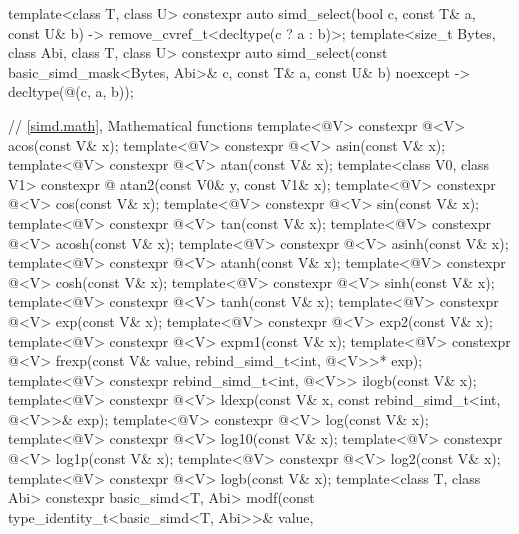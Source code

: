 \begin{codeblock}
{  template<class T, class U>
    constexpr auto simd_select(bool c, const T& a, const U& b)
    -> remove_cvref_t<decltype(c ? a : b)>;
  template<size_t Bytes, class Abi, class T, class U>
    constexpr auto simd_select(const basic_simd_mask<Bytes, Abi>& c, const T& a, const U& b)
    noexcept -> decltype(@\simdselect@(c, a, b));

  // \ref{simd.math}, Mathematical functions
  template<@\mathfloatingpoint@ V> constexpr @\deducedsimd@<V> acos(const V& x);
  template<@\mathfloatingpoint@ V> constexpr @\deducedsimd@<V> asin(const V& x);
  template<@\mathfloatingpoint@ V> constexpr @\deducedsimd@<V> atan(const V& x);
  template<class V0, class V1>
    constexpr @ atan2(const V0& y, const V1& x);
  template<@\mathfloatingpoint@ V> constexpr @\deducedsimd@<V> cos(const V& x);
  template<@\mathfloatingpoint@ V> constexpr @\deducedsimd@<V> sin(const V& x);
  template<@\mathfloatingpoint@ V> constexpr @\deducedsimd@<V> tan(const V& x);
  template<@\mathfloatingpoint@ V> constexpr @\deducedsimd@<V> acosh(const V& x);
  template<@\mathfloatingpoint@ V> constexpr @\deducedsimd@<V> asinh(const V& x);
  template<@\mathfloatingpoint@ V> constexpr @\deducedsimd@<V> atanh(const V& x);
  template<@\mathfloatingpoint@ V> constexpr @\deducedsimd@<V> cosh(const V& x);
  template<@\mathfloatingpoint@ V> constexpr @\deducedsimd@<V> sinh(const V& x);
  template<@\mathfloatingpoint@ V> constexpr @\deducedsimd@<V> tanh(const V& x);
  template<@\mathfloatingpoint@ V> constexpr @\deducedsimd@<V> exp(const V& x);
  template<@\mathfloatingpoint@ V> constexpr @\deducedsimd@<V> exp2(const V& x);
  template<@\mathfloatingpoint@ V> constexpr @\deducedsimd@<V> expm1(const V& x);
  template<@\mathfloatingpoint@ V> constexpr @\deducedsimd@<V> frexp(const V& value,
  rebind_simd_t<int, @\deducedsimd@<V>>* exp);
  template<@\mathfloatingpoint@ V> constexpr rebind_simd_t<int, @\deducedsimd@<V>> ilogb(const V& x);
  template<@\mathfloatingpoint@ V> constexpr @\deducedsimd@<V> ldexp(const V& x, const
  rebind_simd_t<int, @\deducedsimd@<V>>& exp);
  template<@\mathfloatingpoint@ V> constexpr @\deducedsimd@<V> log(const V& x);
  template<@\mathfloatingpoint@ V> constexpr @\deducedsimd@<V> log10(const V& x);
  template<@\mathfloatingpoint@ V> constexpr @\deducedsimd@<V> log1p(const V& x);
  template<@\mathfloatingpoint@ V> constexpr @\deducedsimd@<V> log2(const V& x);
  template<@\mathfloatingpoint@ V> constexpr @\deducedsimd@<V> logb(const V& x);
  template<class T, class Abi>
    constexpr basic_simd<T, Abi> modf(const type_identity_t<basic_simd<T, Abi>>& value,
}
\end{codeblock}
